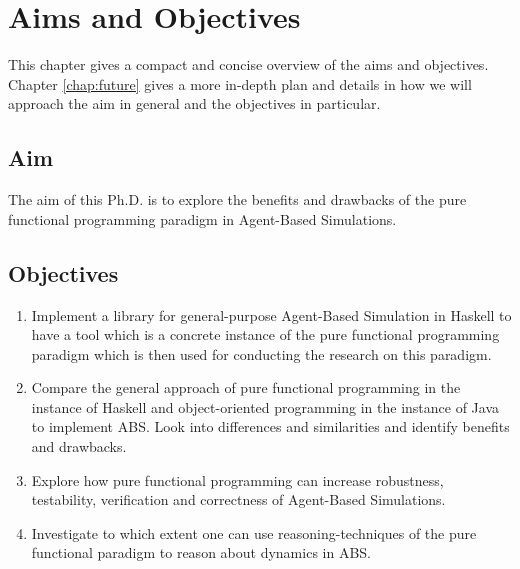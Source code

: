 \chapter{Aims and Objectives}
\label{chap:aimsObj}

This chapter gives a compact and concise overview of the aims and objectives. Chapter \ref{chap:future} gives a more in-depth plan and details in how we will approach the aim in general and the objectives in particular.

\section{Aim}
The aim of this Ph.D. is to explore the benefits and drawbacks of the pure functional programming paradigm in Agent-Based Simulations. 

\section{Objectives}
\begin{enumerate}
	\item Implement a library for general-purpose Agent-Based Simulation in Haskell to have a tool which is a concrete instance of the pure functional programming paradigm which is then used for conducting the research on this paradigm.

	\item Compare the general approach of pure functional programming in the instance of Haskell and object-oriented programming in the instance of Java to implement ABS. Look into differences and similarities and identify benefits and drawbacks.

	\item Explore how pure functional programming can increase robustness, testability, verification and correctness of Agent-Based Simulations.

	\item Investigate to which extent one can use reasoning-techniques of the pure functional paradigm to reason about dynamics in ABS.
\end{enumerate}